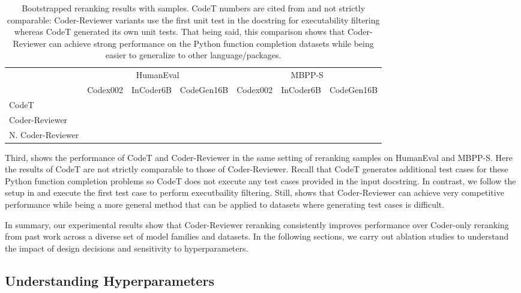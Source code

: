 \documentclass[nohyperref]{article}
\theoremstyle{plain}
\theoremstyle{definition}
\theoremstyle{remark}
\begin{document}
\begin{table*}[]
\setlength{\tabcolsep}{2.2pt}
\centering
\footnotesize
\begin{tabular}{lcccccc}
\toprule
{} & \multicolumn{3}{c}{HumanEval} & \multicolumn{3}{c}{MBPP-S} \\
\cmidrule(lr){2-4}\cmidrule(lr){5-7}
{} &  Codex002 & InCoder6B & CodeGen16B & Codex002 & InCoder6B & CodeGen16B \\
\midrule
CodeT   &     &     &      &    &     &      \\
\midrule
Coder-Reviewer       &     &     &      &    &     &      \\
N. Coder-Reviewer &     &     &      &    &     &      \\
\bottomrule
\end{tabular} \caption{Bootstrapped reranking results with  samples. CodeT numbers are cited from \citet{codet} and not strictly comparable: Coder-Reviewer variants use the first unit test in the docstring for executability filtering whereas CodeT generated its own unit tests.
That being said, this comparison shows that Coder-Reviewer can achieve strong performance on the Python function completion datasets while being easier to generalize to other language/packages.
}
\vspace{-10pt}
\label{tab:codt_table}
\end{table*}

Third,  shows the performance of CodeT and Coder-Reviewer in the same setting of reranking  samples on HumanEval and MBPP-S.
Here the results of CodeT are not strictly comparable to those of Coder-Reviewer.
Recall that CodeT generates additional test cases for these Python function completion problems so CodeT does not execute any test cases provided in the input docstring.
In contrast, we follow the setup in \citet{mbr} and execute the first test case to perform executbaility filtering.
Still,  shows that Coder-Reviewer can achieve very competitive performance while being a more general method that can be applied to datasets where generating test cases is difficult.

In summary, our experimental results show that Coder-Reviewer reranking consistently improves performance over Coder-only reranking from past work across a diverse set of model families and datasets.
In the following sections, we carry out ablation studies to understand the impact of design decisions and sensitivity to hyperparameters.

\subsection{Understanding Hyperparameters}
\end{document}
